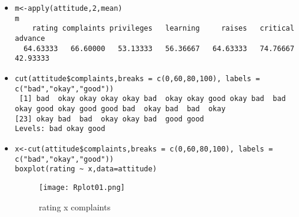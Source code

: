 \documentclass[11pt,a4paper]{book}
\begin{document}
\begin{enumerate}
\begin{itemize}
				\item
					\begin{lstlisting}
m<-apply(attitude,2,mean)
m
    rating complaints privileges   learning     raises   critical    advance 
  64.63333   66.60000   53.13333   56.36667   64.63333   74.76667   42.93333 
					\end{lstlisting}
				\item
					\begin{lstlisting}
cut(attitude$complaints,breaks = c(0,60,80,100), labels = c("bad","okay","good"))
 [1] bad  okay okay okay okay bad  okay okay good okay bad  bad  okay good okay good good bad  okay bad  bad  okay
[23] okay bad  bad  okay okay bad  good good
Levels: bad okay good
					\end{lstlisting}
				\item
					\begin{lstlisting}
x<-cut(attitude$complaints,breaks = c(0,60,80,100), labels = c("bad","okay","good"))
boxplot(rating ~ x,data=attitude)
					\end{lstlisting}
					\begin{figure}[b]
					\centering
					\texttt{[image: Rplot01.png]}
					\caption{rating x complaints}
					\end{figure}
			\end{itemize}
	\end{enumerate}
\end{document}
